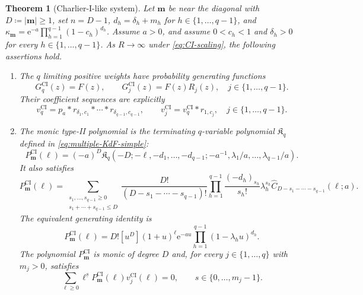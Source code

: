 \documentclass[10pt]{amsart}
\newcommand{\e}{\mathrm e}
\newcommand{\mm}{\boldsymbol m}
\newcommand{\abs}[1]{\lvert#1\rvert}
\newcommand{\fall}[2]{#1^{\underline{#2}}}
\theoremstyle{plain}
\newtheorem{theorem}{Theorem}[section]
\theoremstyle{definition}
\theoremstyle{remark}
\begin{document}
\begin{theorem}[Charlier-I-like system]
\label{thm:CI-system}
Let \(\mm\) be near the diagonal with \(D\coloneq\abs\mm\ge1\), set
\(n=D-1\), \(d_h=\delta_h+m_h\) for
\(h\in\{1,\ldots,q-1\}\), and
\(\kappa_{\mm}=\e^{-a}\prod_{h=1}^{q-1}(1-c_h)^{d_h}\).
Assume \(a>0\), and assume \(0<c_h<1\) and \(\delta_h>0\) for
every \(h\in\{1,\ldots,q-1\}\). As
\(R\to\infty\) under \eqref{eq:CI-scaling}, the following assertions hold.
\begin{enumerate}[label=\textnormal{(\roman*)}]
\item The \(q\) limiting positive weights have
probability generating functions
\begin{equation}
 G_q^{\mathrm{CI}}(z)=F(z),
 \qquad
 G_j^{\mathrm{CI}}(z)=F(z)R_j(z),\quad
 j\in\{1,\ldots,q-1\}.
 \label{eq:CI-row-pgfs}
\end{equation}
Their coefficient sequences are explicitly
\begin{equation}
 v_q^{\mathrm{CI}}
 =p_a*r_{\delta_1,c_1}*\cdots
 *r_{\delta_{q-1},c_{q-1}},
 \qquad
 v_j^{\mathrm{CI}}=v_q^{\mathrm{CI}}*r_{1,c_j},\quad
 j\in\{1,\ldots,q-1\}.
 \label{eq:CI-row-convolutions}
\end{equation}

\item The monic type-II polynomial is the terminating \(q\)-variable polynomial
\(\mathfrak K_q\) defined in \eqref{eq:multiple-KdF-simple}:
\begin{equation}
 P_{\mm}^{\mathrm{CI}}(\ell)
 =(-a)^D\mathfrak K_q
 \left(
 -D;-\ell,-d_1,\ldots,-d_{q-1};
 -a^{-1},\lambda_1/a,\ldots,\lambda_{q-1}/a
 \right).
 \label{eq:CI-A}
\end{equation}
It also satisfies
\begin{equation}
 P_{\mm}^{\mathrm{CI}}(\ell)
 =\sum_{\substack{s_1,\ldots,s_{q-1}\ge0\\
                  s_1+\cdots+s_{q-1}\le D}}
 \frac{D!}{(D-s_1-\cdots-s_{q-1})!}
 \prod_{h=1}^{q-1}\frac{(-d_h)_{s_h}}{s_h!}\lambda_h^{s_h}
 \widehat C_{D-s_1-\cdots-s_{q-1}}(\ell;a).
 \label{eq:CI-A-Charlier-expansion}
\end{equation}
The equivalent generating identity is
\begin{equation}
 P_{\mm}^{\mathrm{CI}}(\ell)
 =D![u^D](1+u)^\ell\e^{-au}
 \prod_{h=1}^{q-1}(1-\lambda_hu)^{d_h}.
\label{eq:CI-A-generating}
\end{equation}
The polynomial \(P_{\mm}^{\mathrm{CI}}\) is monic of degree \(D\) and,
for every \(j\in\{1,\ldots,q\}\) with \(m_j>0\), satisfies
\begin{equation}
 \sum_{\ell\ge0}\fall{\ell}{s}P_{\mm}^{\mathrm{CI}}(\ell)
 v_j^{\mathrm{CI}}(\ell)=0,
 \qquad s\in\{0,\ldots,m_j-1\}.
 \label{eq:CI-A-orthogonality}
\end{equation}


\end{enumerate}
\end{theorem}
\end{document}
